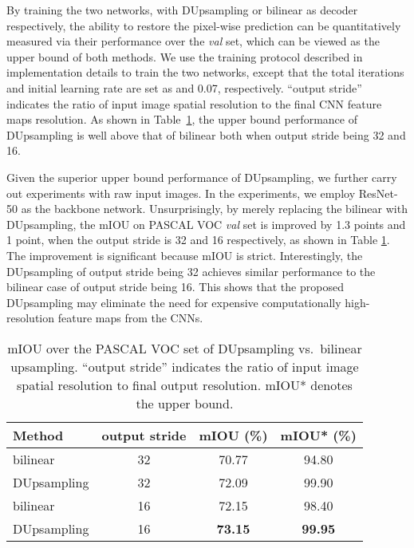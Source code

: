 \documentclass[10pt,twocolumn,letterpaper]{article}
\newcommand{\1}{{\mathbbm{1}}}
\begin{document}
By training the two networks, with DUpsampling or bilinear as decoder respectively, the ability to restore the pixel-wise prediction can be quantitatively measured via their performance over the {\it val} set, which can be viewed as the upper bound of both methods. We use the training protocol described in implementation details to train the two networks, except that the total iterations and initial learning rate are set as  and 0.07, respectively.  ``output stride'' indicates the ratio of input image spatial resolution to the final CNN feature maps resolution. As shown in Table~\ref{table:pca_vs_bilinear}, the upper bound performance of DUpsampling is well above that of bilinear both when output stride being 32 and  16.

Given the superior upper bound performance of DUpsampling, we further carry out experiments with raw input images. In the experiments, we employ ResNet-50 as the backbone network. Unsurprisingly, by merely replacing the bilinear with DUpsampling, the mIOU on PASCAL VOC {\it val} set is improved by 1.3 points and 1 point, when the output stride is 32 and 16 respectively, as shown in Table \ref{table:pca_vs_bilinear}. The improvement is significant because mIOU is strict. Interestingly, the DUpsampling of output stride being 32 achieves similar performance to the bilinear case of output stride being 16.
This shows that the proposed DUpsampling may eliminate the need for expensive computationally high-resolution feature maps from the  CNNs.

\begin{table}
\begin{center}
\small
\begin{tabular}{ l|c|c|c  }
\hline
Method & output stride & mIOU (\%) & mIOU* (\%)\\
\hline\hline
bilinear & 32 & 70.77 & 94.80\\
DUpsampling & 32 & 72.09 & 99.90 \\
bilinear & 16 & 72.15 & 98.40 \\
DUpsampling & 16 & \textbf{73.15} & \textbf{99.95} \\
\hline
\end{tabular}
\end{center}
\vspace{-0.3cm}
\caption{mIOU over the PASCAL VOC  set of DUpsampling vs.\ bilinear upsampling.  ``output stride'' indicates the ratio of input image spatial resolution to final output resolution. mIOU* denotes the upper bound.}
\label{table:pca_vs_bilinear}
\vspace{-0.5cm}
\end{table}
\end{document}
